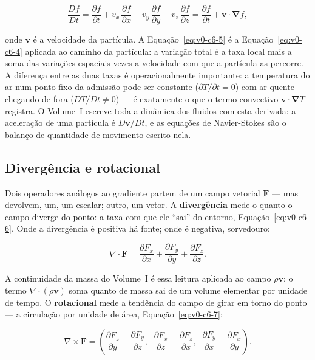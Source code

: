 \documentclass[12pt,a4paper]{article}
\numberwithin{equation}{section}
\numberwithin{table}{section}
\numberwithin{figure}{section}
\begin{document}
\begin{equation}\label{eq:v0-c6-5}
\frac{D f}{D t}
  = \frac{\partial f}{\partial t}
  + v_x\,\frac{\partial f}{\partial x}
  + v_y\,\frac{\partial f}{\partial y}
  + v_z\,\frac{\partial f}{\partial z}
  = \frac{\partial f}{\partial t} + \bm{v}\cdot\bm{\nabla} f,
\end{equation}

onde $\bm{v}$ é a velocidade da partícula. A Equação~\eqref{eq:v0-c6-5} é a
Equação~\eqref{eq:v0-c6-4} aplicada ao caminho da partícula: a variação
total é a taxa local mais a soma das variações espaciais vezes a velocidade
com que a partícula as percorre. A diferença entre as duas taxas é
operacionalmente importante: a temperatura do ar num ponto fixo da
admissão pode ser constante ($\partial T/\partial t = 0$) com ar quente
chegando de fora ($D T/D t \neq 0$) --- é exatamente o que o termo
convectivo $\bm{v}\cdot\bm{\nabla}T$ registra. O Volume~I escreve toda a
dinâmica dos fluidos com esta derivada: a aceleração de uma partícula é
$D\bm{v}/D t$, e as equações de Navier-Stokes são o balanço de quantidade
de movimento escrito nela.

\subsection{Divergência e rotacional}

Dois operadores análogos ao gradiente partem de um campo vetorial $\bm{F}$
--- mas devolvem, um, um escalar; outro, um vetor. A \textbf{divergência}
mede o quanto o campo diverge do ponto: a taxa com que ele ``sai'' do
entorno, Equação~\eqref{eq:v0-c6-6}. Onde a divergência é positiva há
fonte; onde é negativa, sorvedouro:

\begin{equation}\label{eq:v0-c6-6}
\nabla\cdot\bm{F}
  = \frac{\partial F_x}{\partial x}
  + \frac{\partial F_y}{\partial y}
  + \frac{\partial F_z}{\partial z}.
\end{equation}

A continuidade da massa do Volume~I é essa leitura aplicada ao campo
$\rho\bm{v}$: o termo $\nabla\cdot(\rho\bm{v})$ soma quanto de massa sai
de um volume elementar por unidade de tempo. O \textbf{rotacional} mede a
tendência do campo de girar em torno do ponto --- a circulação por
unidade de área, Equação~\eqref{eq:v0-c6-7}:

\begin{equation}\label{eq:v0-c6-7}
\nabla\times\bm{F}
  = \left(
      \frac{\partial F_z}{\partial y}
    - \frac{\partial F_y}{\partial z},\;\;
      \frac{\partial F_x}{\partial z}
    - \frac{\partial F_z}{\partial x},\;\;
      \frac{\partial F_y}{\partial x}
    - \frac{\partial F_x}{\partial y}
    \right).
\end{equation}
\end{document}
